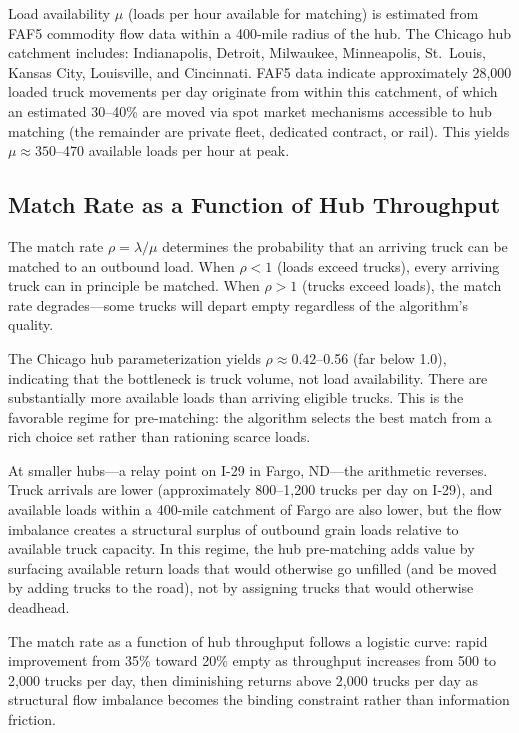 Load availability $\mu$ (loads per hour available for matching) is estimated from FAF5 commodity flow data \citep{FAF5_2023} within a 400-mile radius of the hub. The Chicago hub catchment includes: Indianapolis, Detroit, Milwaukee, Minneapolis, St.\ Louis, Kansas City, Louisville, and Cincinnati. FAF5 data indicate approximately 28,000 loaded truck movements per day originate from within this catchment, of which an estimated 30--40\% are moved via spot market mechanisms accessible to hub matching (the remainder are private fleet, dedicated contract, or rail). This yields $\mu \approx 350$--470 available loads per hour at peak.

\subsection{Match Rate as a Function of Hub Throughput}

The match rate $\rho = \lambda / \mu$ determines the probability that an arriving truck can be matched to an outbound load. When $\rho < 1$ (loads exceed trucks), every arriving truck can in principle be matched. When $\rho > 1$ (trucks exceed loads), the match rate degrades---some trucks will depart empty regardless of the algorithm's quality.

The Chicago hub parameterization yields $\rho \approx 0.42$--0.56 (far below 1.0), indicating that the bottleneck is truck volume, not load availability. There are substantially more available loads than arriving eligible trucks. This is the favorable regime for pre-matching: the algorithm selects the best match from a rich choice set rather than rationing scarce loads.

At smaller hubs---a relay point on I-29 in Fargo, ND---the arithmetic reverses. Truck arrivals are lower (approximately 800--1,200 trucks per day on I-29), and available loads within a 400-mile catchment of Fargo are also lower, but the flow imbalance creates a structural surplus of outbound grain loads relative to available truck capacity. In this regime, the hub pre-matching adds value by surfacing available return loads that would otherwise go unfilled (and be moved by adding trucks to the road), not by assigning trucks that would otherwise deadhead.

The match rate as a function of hub throughput follows a logistic curve: rapid improvement from 35\% toward 20\% empty as throughput increases from 500 to 2,000 trucks per day, then diminishing returns above 2,000 trucks per day as structural flow imbalance becomes the binding constraint rather than information friction.
